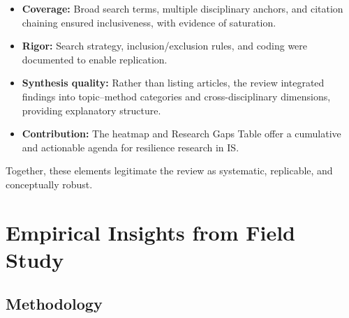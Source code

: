 \begin{itemize}
    \item \textbf{Coverage:} Broad search terms, multiple disciplinary anchors, and citation chaining ensured inclusiveness, with evidence of saturation.
    \item \textbf{Rigor:} Search strategy, inclusion/exclusion rules, and coding were documented to enable replication.  
    \item \textbf{Synthesis quality:} Rather than listing articles, the review integrated findings into topic–method categories and cross-disciplinary dimensions, providing explanatory structure.  
    \item \textbf{Contribution:} The heatmap and Research Gaps Table offer a cumulative and actionable agenda for resilience research in IS.\\
\end{itemize}

Together, these elements legitimate the review as systematic, replicable, and conceptually robust.

\section{Empirical Insights from Field Study}
\label{appendix:C}

\subsection{Methodology}

